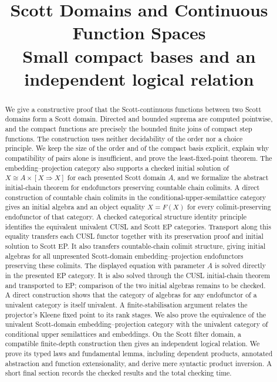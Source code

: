 \documentclass[11pt,a4paper]{article}
\title{Scott Domains and Continuous Function Spaces\\
  \large Small compact bases and an independent logical relation}
\author{}
\date{}
\theoremstyle{definition}
\theoremstyle{remark}
\newcommand{\Cont}[2]{[#1\mathbin{\Rightarrow}#2]}
\begin{document}
\maketitle

\begin{abstract}
We give a constructive proof that the Scott-continuous functions between
two Scott domains form a Scott domain. Directed and bounded suprema are
computed pointwise, and the compact functions are precisely the bounded
finite joins of compact step functions.
The construction uses neither decidability of the order nor a choice
principle. We keep the size of the order and of the compact basis explicit,
explain why compatibility of pairs alone is insufficient, and prove the
least-fixed-point theorem. The embedding--projection category also supports
a checked initial solution of $X\cong A\times\Cont{X}{X}$ for each presented
Scott domain $A$, and we formalize the abstract initial-chain theorem for
endofunctors preserving countable chain colimits. A direct
construction of countable chain colimits in the conditional-upper-semilattice
category gives an initial algebra and an object equality $X=F(X)$ for
every colimit-preserving endofunctor of that category. A checked
categorical structure identity principle identifies the equivalent
univalent CUSL and Scott EP categories. Transport along this equality
transfers each CUSL functor together with its preservation proof and initial
solution to Scott EP. It also transfers countable-chain colimit structure,
giving initial algebras for all unpresented Scott-domain
embedding--projection endofunctors preserving these colimits.
The displayed equation with parameter $A$ is solved directly in the
presented EP category. It is also solved through the CUSL initial-chain
theorem and transported to EP; comparison of the two initial algebras
remains to be checked.
A direct
construction shows that the category of algebras for any endofunctor
of a univalent category is itself univalent. A finite-stabilisation
argument relates
the projector's Kleene fixed point to its rank stages. We also prove the
equivalence of the univalent Scott-domain embedding--projection category
with the univalent category of conditional upper semilattices and embeddings.
On the Scott filter
domain, a compatible finite-depth construction then gives an independent
logical relation. We prove its typed laws and fundamental lemma, including
dependent products, annotated abstraction and function extensionality,
and derive mere syntactic product inversion. A short final section records
the checked results and the total checking time.
\end{abstract}
\end{document}
